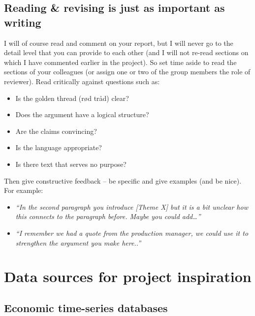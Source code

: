 \documentclass[
]{book}
\begin{document}
\hypertarget{reading-revising-is-just-as-important-as-writing}{%
\section{Reading \& revising is just as important as writing}\label{reading-revising-is-just-as-important-as-writing}}

I will of
course read and comment on your report, but I will never go to the
detail level that you can provide to each other (and I will not
re-read sections on which I have commented earlier in the project).
So set time aside to read the sections of your colleagues (or assign
one or two of the group members the role of reviewer). Read
critically against questions such as:

\begin{itemize}
\item
  Is the golden thread (rød tråd) clear?
\item
  Does the argument have a logical structure?
\item
  Are the claims convincing?
\item
  Is the language appropriate?
\item
  Is there text that serves no purpose?
\end{itemize}

Then give constructive feedback -- be specific and give examples (and be
nice). For example:

\begin{itemize}
\item
  \emph{``In the second paragraph you introduce {[}Theme X{]} but it is a bit
  unclear how this connects to the paragraph before. Maybe you could
  add\ldots{}''}
\item
  \emph{``I remember we had a quote from the production manager, we could
  use it to strengthen the argument you make here..''}
\end{itemize}

\hypertarget{data-sources-for-project-inspiration}{%
\chapter{Data sources for project inspiration}\label{data-sources-for-project-inspiration}}

\hypertarget{economic-time-series-databases}{%
\section{Economic time-series databases}\label{economic-time-series-databases}}
\end{document}
